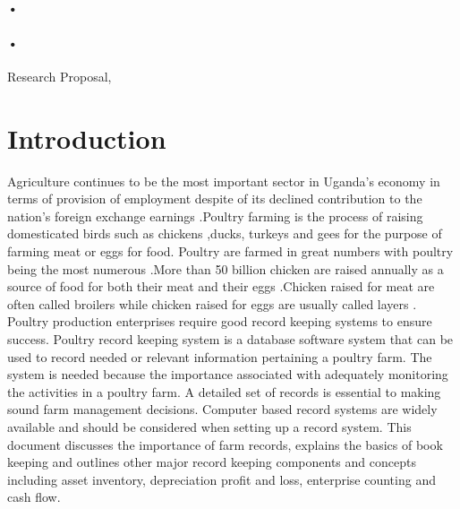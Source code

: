 \documentclass[12pt,]{article}
\begin{document}
\begin{titlepage}
\paragraph*{•}
\paragraph*{•}
  \begin{flushright}
  Research Proposal,\\
 
 \tableofcontents

  \end{flushright}
\date{\today}
\end{titlepage}

\newpage



\section{Introduction}
Agriculture continues to be the most important sector in Uganda's economy in terms of provision of employment despite of its declined contribution to  the nation's foreign exchange earnings .Poultry farming is the process of raising domesticated birds such as chickens ,ducks, turkeys and gees for the purpose of farming meat or eggs for food. Poultry are farmed in great numbers  with poultry being the  most numerous .More than 50 billion chicken are raised annually as a source of food for both their meat and their eggs .Chicken raised for meat are often called broilers while chicken raised for eggs are usually called  layers . Poultry production enterprises require good record keeping systems to ensure success.
Poultry record keeping system is a database software system that can be used to record needed or relevant information pertaining a poultry farm. The system is needed because the importance associated with adequately monitoring the activities in a poultry farm. A detailed set of records is essential to making sound farm management decisions. Computer based record systems are widely available and should be considered when setting up a record system.
This document discusses the importance of farm records, explains the basics of book keeping and outlines other major record keeping components and concepts including asset inventory, depreciation profit and loss, enterprise counting and cash flow. 
\end{document}
